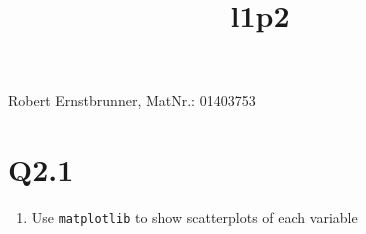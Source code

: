 \documentclass[11pt]{article}
\title{l1p2}
\providecommand{\tightlist}{%
      \setlength{\itemsep}{0pt}\setlength{\parskip}{0pt}}
\begin{document}
    
    
    \maketitle
    
    

    
    Robert Ernstbrunner, MatNr.: 01403753

    \section{Q2.1}\label{q2.1}

    \begin{enumerate}
\def\labelenumi{\arabic{enumi}.}
\tightlist
\item
  Use \texttt{matplotlib} to show scatterplots of each variable
\end{enumerate}
\end{document}
